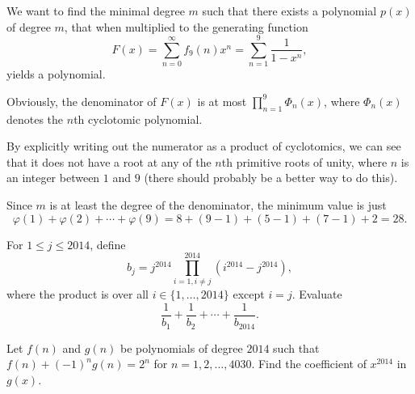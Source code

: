 \begin{solution}[name={Solution by Nyash}]
	We want to find the minimal degree $m$ such that there exists a polynomial $p(x)$ of degree $m$, that when multiplied to the generating function\[F(x) = \displaystyle\sum_{n=0}^{\infty}f_9(n)x^n = \sum_{n=1}^9\dfrac{1}{1-x^n},\]yields a polynomial.
	
	Obviously, the denominator of $F(x)$ is at most $\prod_{n=1}^9\Phi_n(x)$, where $\Phi_n(x)$ denotes the $n$th cyclotomic polynomial.
	
	By explicitly writing out the numerator as a product of cyclotomics, we can see that it does not have a root at any of the $n$th primitive roots of unity, where $n$ is an integer between $1$ and $9$ (there should probably be a better way to do this).
	
	Since $m$ is at least the degree of the denominator, the minimum value is just\[\varphi(1)+\varphi(2)+\cdots+\varphi(9)= 8+(9-1)+(5-1)+(7-1)+2=\boxed{28}.\]
\end{solution}







\begin{question}[name={2014 HMMT, Guts, \href{https://artofproblemsolving.com/community/c129h603986p3586745}{Problem 26}}]
	For $1\leq j\leq 2014$, define\[b_j=j^{2014}\prod_{i=1, i\neq j}^{2014}(i^{2014}-j^{2014}),\]where the product is over all $i\in\{1,\ldots,2014\}$ except $i=j$. Evaluate\[\dfrac1{b_1}+\dfrac1{b_2}+\cdots+\dfrac1{b_{2014}}.\]
\end{question}




%	







\begin{question}[name={2014 HMMT, Guts, \href{https://artofproblemsolving.com/community/c129h603988p3586749}{Problem 28}}]
	Let $f(n)$ and $g(n)$ be polynomials of degree $2014$ such that $f(n)+(-1)^ng(n)=2^n$ for $n=1,2,\ldots,4030$. Find the coefficient of $x^{2014}$ in $g(x)$.	
\end{question}




%	





